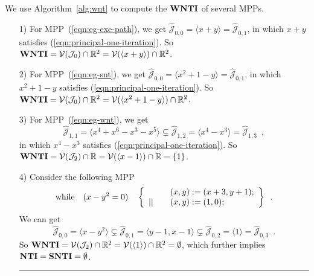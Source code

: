 \documentclass{jssc}
\newcommand{\rulex}{\hfill\rule{1mm}{3mm}}
\newcommand{\while}{{\rm while}}
\newcommand{\J}{\mathcal{J}}
\newcommand{\V}{\mathcal{V}}
\newcommand{\NTI}{{\bf NTI}}
\newcommand{\SNTI}{{\bf SNTI}}
\newcommand{\WNTI}{{\bf WNTI}}
\begin{document}
\begin{example}\label{eg:computation-wnt}
We use Algorithm~\ref{alg:wnt} to compute the $\WNTI$ of several MPPs.
\begin{enumerate}
\item[1)] For MPP~(\ref{eqn:eg-exe-path}), we get $\hat{\J}_{0,0}= \langle x+y \rangle = \hat{\J}_{0,1}$, in which $x+y$ satisfies (\ref{eqn:principal-one-iteration}). So $\WNTI = \V(\J_0) \cap \mathbb{R}^2 = \V(\langle x+y \rangle) \cap \mathbb{R}^2$.
\item[2)] For MPP~(\ref{eqn:eg-snt}), we get $\hat{\J}_{0,0} = \langle x^2+1-y \rangle = \hat{\J}_{0,1}$, in which $x^2+1-y$ satisfies (\ref{eqn:principal-one-iteration}). So $\WNTI = \V(\J_0) \cap \mathbb{R}^2 = \V(\langle x^2+1-y \rangle) \cap \mathbb{R}^2$.
\item[3)] For MPP~(\ref{eqn:eg-wnt}), we get
     \[
     \hat{\J}_{1,1} = \langle x^4+x^6-x^3-x^5 \rangle \subsetneq \hat{\J}_{1,2} = \langle x^4-x^3 \rangle = \hat{\J}_{1,3} \enspace ,
     \]
     in which $x^4-x^3$ satisfies (\ref{eqn:principal-one-iteration}). So $\WNTI = \V(\J_2) \cap \mathbb{R} = \V(\langle x-1 \rangle) \cap \mathbb{R} = \{1\}$.
\item[4)] Consider the following MPP
    \begin{equation}\label{eqn:eg-wnt-empty}
    \while \quad (x-y^2=0) \quad \left\{
    \begin{array}{ll}
    & \quad (x,y) := (x+3,y+1); \\
    || & \quad (x,y) := (1,0); \\
    \end{array}
    \right\} \enspace .
    \end{equation}
    We can get
    \[
    \hat{\J}_{0,0} = \langle x-y^2 \rangle \subsetneq \hat{\J}_{0,1} = \langle y-1,x-1 \rangle \subsetneq \hat{\J}_{0,2} = \langle 1 \rangle = \hat{\J}_{0,3} \enspace .
    \]
    So $\WNTI = \V(\J_2) \cap \mathbb{R}^2 = \V(\langle 1 \rangle) \cap \mathbb{R}^2 = \emptyset$, which further implies $\NTI=\SNTI=\emptyset$. \rulex
\end{enumerate}
\end{example}
\end{document}
